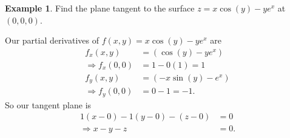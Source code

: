 \documentclass[12pt, letter]{article}
\theoremstyle{plain}
\numberwithin{theorem}{section}
\theoremstyle{definition}
\newtheorem{example}[theorem]{Example}
\begin{document}
\bigskip

\hrulefill

\bigskip

\begin{example}
Find the plane tangent to the surface $z=x\cos(y)-ye^x$ at $(0,0,0)$.

\smallskip

Our partial derivatives of $f(x,y) = x\cos(y)-ye^x$ are
\begin{align*}
f_x(x,y) &= \left(\cos(y)-ye^x\right)\\
\Rightarrow f_x(0,0) &= 1-0(1) = 1\\
f_y(x,y) &= \left(-x\sin(y)-e^x\right)\\
\Rightarrow f_y(0,0) &= 0-1 = -1.
\end{align*}
So our tangent plane is
\begin{align*}
1(x-0)-1(y-0)-(z-0) &= 0\\
\Rightarrow x-y-z &= 0.
\end{align*}
\end{example}

\bigskip

\hrulefill

\bigskip
\end{document}

